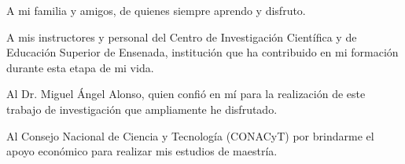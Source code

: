 
\hspace{12pt}
A mi familia y amigos, de quienes siempre aprendo y disfruto.
\bigskip

A mis instructores y personal del Centro de Investigación Científica y de Educación Superior de Ensenada, institución que ha contribuido en mi formación durante esta etapa de mi vida. 
\bigskip

Al Dr. Miguel Ángel Alonso, quien confió en mí para la realización de este trabajo de investigación que ampliamente he disfrutado.

\bigskip

Al Consejo Nacional de Ciencia y Tecnología (CONACyT) por brindarme el apoyo econ\'omico para realizar mis estudios de maestría.
